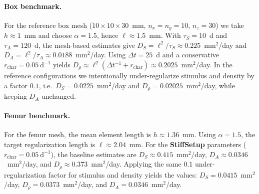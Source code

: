 \paragraph{Box benchmark.}
For the reference box mesh ($10\times 10\times 30$~mm, $n_x=n_y=10$, $n_z=30$) we take $h\approx 1$~mm and choose $\alpha=1.5$, hence $\ell\approx 1.5$~mm.
With $\tau_S=10$~d and $\tau_A=120$~d, the mesh-based estimates give $D_S=\ell^2/\tau_S\approx 0.225$~mm$^2$/day and $D_A=\ell^2/\tau_A\approx 0.0188$~mm$^2$/day.
Using $\Delta t=25$~d and a conservative $r_{\mathrm{char}}=0.05~\mathrm{d^{-1}}$ yields $D_\rho\approx \ell^2(\Delta t^{-1}+r_{\mathrm{char}})\approx 0.2025$~mm$^2$/day.
In the reference configurations we intentionally under-regularize stimulus and density by a factor $0.1$, i.e.\ $D_S=0.0225$~mm$^2$/day and $D_\rho=0.02025$~mm$^2$/day, while keeping $D_A$ unchanged.

\paragraph{Femur benchmark.}
For the femur mesh, the mean element length is $h\approx 1.36$~mm.
Using $\alpha=1.5$, the target regularization length is $\ell\approx 2.04$~mm.
For the \textbf{StiffSetup} parameters ($r_{\mathrm{char}}=0.05~\mathrm{d^{-1}}$), the baseline estimates are $D_S\approx 0.415$~mm$^2$/day, $D_A\approx 0.0346$~mm$^2$/day, and $D_\rho\approx 0.373$~mm$^2$/day.
Applying the same $0.1$ under-regularization factor for stimulus and density yields the values: $D_S=0.0415$~mm$^2$/day, $D_\rho=0.0373$~mm$^2$/day, and $D_A=0.0346$~mm$^2$/day.
